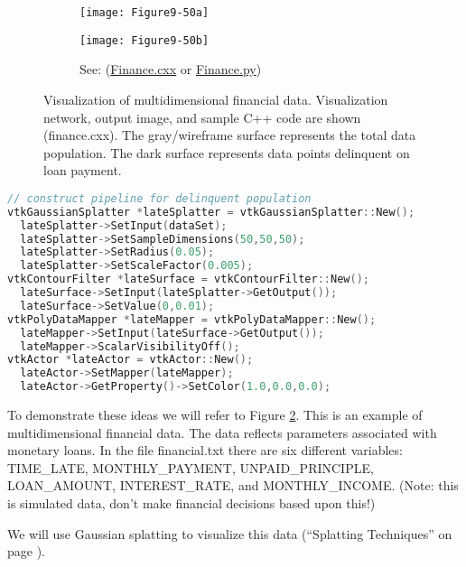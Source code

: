 \begin{figure}[htb]
    \centering
	\begin{subfigure}[h]{0.48\linewidth}
		\texttt{[image: Figure9-50a]}
		\captionsetup{justification=centering}
		\caption*{}
		\label{fig:Figure9-50a}
	\end{subfigure}
	\hfill
	\begin{subfigure}[h]{0.48\linewidth}
		\texttt{[image: Figure9-50b]}
		\captionsetup{justification=centering}
		\caption*{See: (\href{https://lorensen.github.io/VTKExamples/site/Cxx/Modelling/Finance/}{Finance.cxx} or \href{https://lorensen.github.io/VTKExamples/site/Python/Modelling/Finance/}{Finance.py})}
	\end{subfigure}
	\caption{Visualization of multidimensional financial data. Visualization network, output image, and sample C++ code are shown (finance.cxx). The gray/wireframe surface represents the total data population. The dark surface represents data points delinquent on loan payment.}\label{fig:Figure9-50}
\end{figure}

\begin{lstlisting}[language=C++, caption={Visualizing multidimensional data.}]
// construct pipeline for delinquent population
vtkGaussianSplatter *lateSplatter = vtkGaussianSplatter::New();
  lateSplatter->SetInput(dataSet);
  lateSplatter->SetSampleDimensions(50,50,50);
  lateSplatter->SetRadius(0.05);
  lateSplatter->SetScaleFactor(0.005);
vtkContourFilter *lateSurface = vtkContourFilter::New();
  lateSurface->SetInput(lateSplatter->GetOutput());
  lateSurface->SetValue(0,0.01);
vtkPolyDataMapper *lateMapper = vtkPolyDataMapper::New();
  lateMapper->SetInput(lateSurface->GetOutput());
  lateMapper->ScalarVisibilityOff();
vtkActor *lateActor = vtkActor::New();
  lateActor->SetMapper(lateMapper);
  lateActor->GetProperty()->SetColor(1.0,0.0,0.0);
\end{lstlisting}

To demonstrate these ideas we will refer to Figure \ref{fig:Figure9-50}. This is an example of multidimensional financial data. The data reflects parameters associated with monetary loans. In the file financial.txt there are six different variables: TIME\_LATE, MONTHLY\_PAYMENT, UNPAID\_PRINCIPLE, LOAN\_AMOUNT, INTEREST\_RATE, and MONTHLY\_INCOME. (Note: this is simulated data, don't make financial decisions based upon this!)

We will use Gaussian splatting to visualize this data (``Splatting Techniques'' on page \pageref{subsec:visualizing_unstructured_points_splatting_techniques}).

